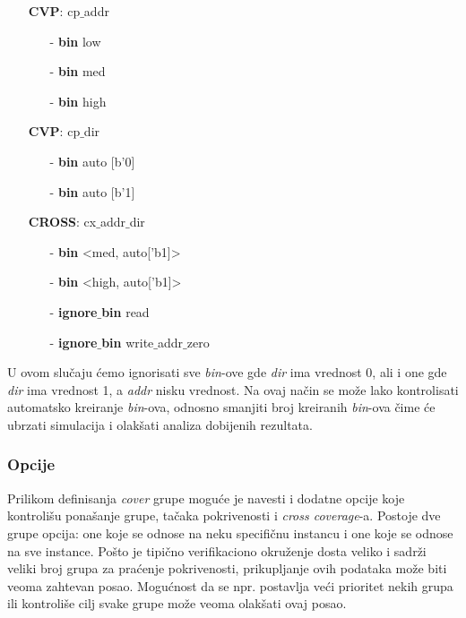 \begin{itemize}
\item[] \textbf{CVP}: cp\(\_\)addr
  \begin{itemize}
  \item[-] \textbf{bin} low
  \item[-] \textbf{bin} med
  \item[-] \textbf{bin} high
  \end{itemize}
\item[] \textbf{CVP}: cp\(\_\)dir
  \begin{itemize}
  \item[-] \textbf{bin} auto [b'0]
  \item[-] \textbf{bin} auto [b'1]
  \end{itemize}
\item[] \textbf{CROSS}: cx\(\_\)addr\(\_\)dir
  \begin{itemize}
  \item[-] \textbf{bin} <med, auto['b1]>
  \item[-] \textbf{bin} <high, auto['b1]>
  \item[-] \textbf{ignore\(\_\)bin} read
  \item[-] \textbf{ignore\(\_\)bin} write\(\_\)addr\(\_\)zero
  \end{itemize}
\end{itemize}

U ovom slučaju ćemo ignorisati sve \emph{bin}-ove gde \emph{dir} ima vrednost 0,
ali i one gde \emph{dir} ima vrednost 1, a \emph{addr} nisku vrednost. Na ovaj
način se može lako kontrolisati automatsko kreiranje \emph{bin}-ova, odnosno
smanjiti broj kreiranih \emph{bin}-ova čime će ubrzati simulacija i olakšati
analiza dobijenih rezultata.

\subsubsection{Opcije}

Prilikom definisanja \emph{cover} grupe moguće je navesti i dodatne opcije koje
kontrolišu ponašanje grupe, tačaka pokrivenosti i \emph{cross coverage}-a.
Postoje dve grupe opcija: one koje se odnose na neku specifičnu instancu i one
koje se odnose na sve instance. Pošto je tipično verifikaciono okruženje dosta
veliko i sadrži veliki broj grupa za praćenje pokrivenosti, prikupljanje ovih
podataka može biti veoma zahtevan posao. Mogućnost da se npr. postavlja veći
prioritet nekih grupa ili kontroliše cilj svake grupe može veoma olakšati ovaj
posao.\\

